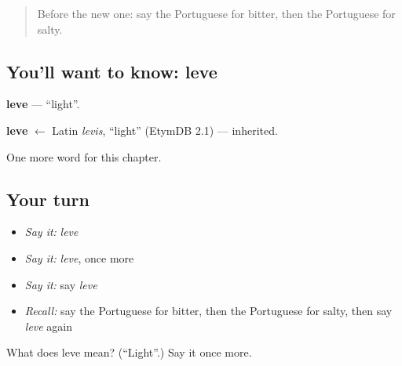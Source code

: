 \begin{quote}
Before the new one: say the Portuguese for bitter, then the Portuguese for salty.
\end{quote}

\subsection*{You'll want to know: leve}
\textbf{leve} — \textquotedblleft{}light\textquotedblright{}.

\begin{cousinweb}
\textbf{leve} $\leftarrow$ Latin \emph{levis}, \textquotedblleft{}light\textquotedblright{} (EtymDB 2.1) — inherited.
\end{cousinweb}

\begin{grammarlens}[title={What you've built}]
One more word for this chapter.
\end{grammarlens}

\subsection*{Your turn}
\begin{itemize}
\raggedright
  \item \emph{Say it:} \emph{leve}
  \item \emph{Say it:} \emph{leve}, once more
  \item \emph{Say it:} say \emph{leve}
  \item \emph{Recall:} say the Portuguese for bitter, then the Portuguese for salty, then say \emph{leve} again
\end{itemize}

\begin{tcolorbox}[breakable,colback=teal!4,colframe=teal!35!black,title={Before you move on}]
What does leve mean? (\textquotedblleft{}Light\textquotedblright{}.) Say it once more.
\end{tcolorbox}

